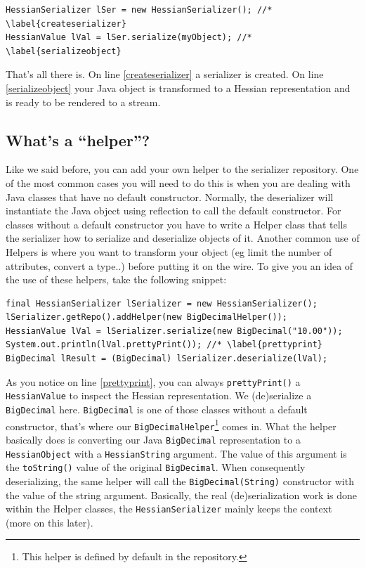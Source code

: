 \documentclass[a4paper]{article}
\begin{document}
\medskip
\begin{lstlisting}
HessianSerializer lSer = new HessianSerializer(); //* \label{createserializer} 
HessianValue lVal = lSer.serialize(myObject); //* \label{serializeobject}
\end{lstlisting}
\medskip

That's all there is. On line \ref{createserializer} a serializer is created. On line \ref{serializeobject} your Java object is transformed to a Hessian representation and is ready to be rendered to a stream.

\subsection{What's a ``helper''?}

Like we said before, you can add your own helper to the serializer repository. 
One of the most common cases you will need to do this is when you are dealing with Java classes that have no default constructor.
Normally, the deserializer will instantiate the Java object using reflection to call the default constructor.
For classes without a default constructor you have to write a Helper class that tells the serializer how to serialize and deserialize objects of it. Another common use of Helpers is where you want to transform your object (eg limit the number of attributes, convert a type..) before putting it on the wire. To give you an idea of the use of these helpers, take the following snippet:

\medskip
\begin{lstlisting}
final HessianSerializer lSerializer = new HessianSerializer();
lSerializer.getRepo().addHelper(new BigDecimalHelper());
HessianValue lVal = lSerializer.serialize(new BigDecimal("10.00"));
System.out.println(lVal.prettyPrint()); //* \label{prettyprint}
BigDecimal lResult = (BigDecimal) lSerializer.deserialize(lVal);
\end{lstlisting}
\medskip

As you notice on line \ref{prettyprint}, you can always \lstinline$prettyPrint()$ a \lstinline$HessianValue$ to inspect the Hessian representation. We (de)serialize a \lstinline$BigDecimal$ here. \lstinline$BigDecimal$ is one of those classes without a default constructor, that's where our \lstinline$BigDecimalHelper$\footnote{This helper is defined by default in the repository.} comes in.  What the helper basically does is converting our Java \lstinline$BigDecimal$ representation to a \lstinline$HessianObject$ with a \lstinline$HessianString$ argument. The value of this argument is the \lstinline$toString()$ value of the original \lstinline$BigDecimal$. When consequently deserializing, the same helper will call the \lstinline$BigDecimal(String)$ constructor with the value of the string argument. Basically, the real (de)serialization work is done within the Helper classes, the \lstinline$HessianSerializer$ mainly keeps the context (more on this later).
\end{document}
